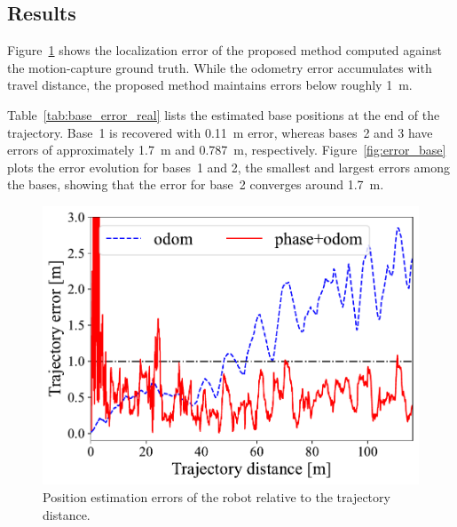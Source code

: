 \documentclass[conference]{IEEEtran}
\begin{document}
\subsection{Results}
Figure~\ref{fig:error_real} shows the localization error of the proposed method computed against the motion-capture ground truth.
While the odometry error accumulates with travel distance, the proposed method maintains errors below roughly 1~m.

Table~\ref{tab:base_error_real} lists the estimated base positions at the end of the trajectory.
Base~1 is recovered with 0.11~m error, whereas bases~2 and 3 have errors of approximately 1.7~m and 0.787~m, respectively.
Figure~\ref{fig:error_base} plots the error evolution for bases~1 and 2, the smallest and largest errors among the bases, showing that the error for base~2 converges around 1.7~m.

\begin{figure}
    \centering
    \includegraphics[width=0.95\linewidth]{figures/robosym_online_rover_position_error.pdf}
    \caption{Position estimation errors of the robot relative to the trajectory distance.}
    \label{fig:error_real}
\end{figure}
\end{document}
